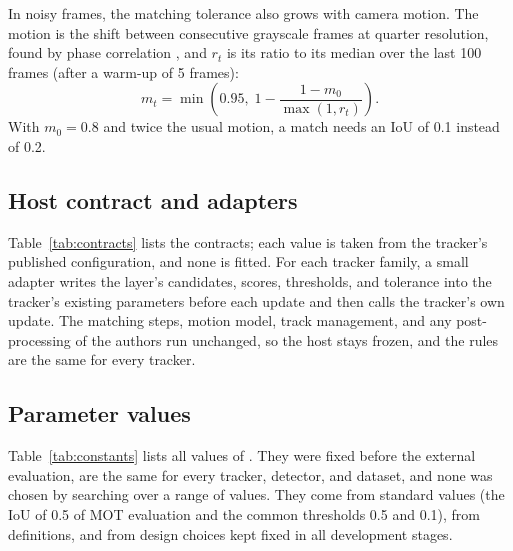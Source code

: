 In noisy frames, the matching tolerance also grows with camera motion. The motion is the shift
between consecutive grayscale frames at quarter resolution, found by phase correlation
\cite{reddy1996phasecorr}, and $r_t$ is its ratio to its median over the last 100 frames (after a
warm-up of 5 frames):
\begin{equation}
m_t=\min\!\left(0.95,\;1-\frac{1-m_0}{\max(1,r_t)}\right).
\label{eq:motion}
\end{equation}
With $m_0=0.8$ and twice the usual motion, a match needs an IoU of 0.1 instead of 0.2.

\subsection{Host contract and adapters}\label{sec:contract}
Table~\ref{tab:contracts} lists the contracts; each value is taken from the tracker's published
configuration, and none is fitted. For each tracker family, a small adapter writes the layer's
candidates, scores, thresholds, and tolerance into the tracker's existing parameters before each
update and then calls the tracker's own update. The matching steps, motion model, track
management, and any post-processing of the authors run unchanged, so the host stays frozen, and the
rules are the same for every tracker.



\subsection{Parameter values}\label{sec:constants}
Table~\ref{tab:constants} lists all values of \scl{}. They were fixed before the external
evaluation, are the same for every tracker, detector, and dataset, and none was chosen by searching
over a range of values. They come from standard values (the IoU of 0.5 of MOT evaluation and the
common thresholds 0.5 and 0.1), from definitions, and from design choices kept fixed in all
development stages.

